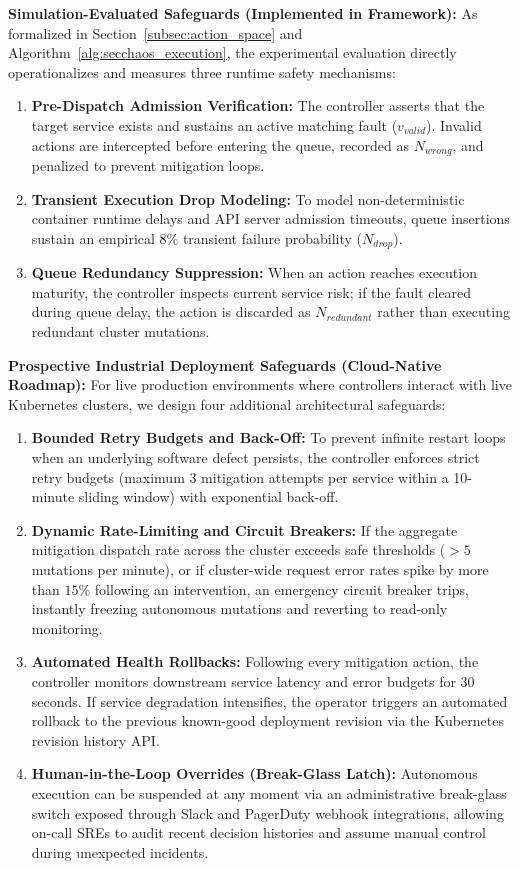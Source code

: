 \documentclass[ASNA,twocolumn]{USG}
\begin{document}
\textbf{Simulation-Evaluated Safeguards (Implemented in Framework):} As formalized in Section~\ref{subsec:action_space} and Algorithm~\ref{alg:secchaos_execution}, the experimental evaluation directly operationalizes and measures three runtime safety mechanisms:
\begin{enumerate}
    \item \textbf{Pre-Dispatch Admission Verification:} The controller asserts that the target service exists and sustains an active matching fault ($v_{valid}$). Invalid actions are intercepted before entering the queue, recorded as $N_{wrong}$, and penalized to prevent mitigation loops.
    \item \textbf{Transient Execution Drop Modeling:} To model non-deterministic container runtime delays and API server admission timeouts, queue insertions sustain an empirical $8\%$ transient failure probability ($N_{drop}$).
    \item \textbf{Queue Redundancy Suppression:} When an action reaches execution maturity, the controller inspects current service risk; if the fault cleared during queue delay, the action is discarded as $N_{redundant}$ rather than executing redundant cluster mutations.
\end{enumerate}

\textbf{Prospective Industrial Deployment Safeguards (Cloud-Native Roadmap):} For live production environments where controllers interact with live Kubernetes clusters, we design four additional architectural safeguards:
\begin{enumerate}
    \item \textbf{Bounded Retry Budgets and Back-Off:} To prevent infinite restart loops when an underlying software defect persists, the controller enforces strict retry budgets (maximum 3 mitigation attempts per service within a 10-minute sliding window) with exponential back-off.
    \item \textbf{Dynamic Rate-Limiting and Circuit Breakers:} If the aggregate mitigation dispatch rate across the cluster exceeds safe thresholds ($> 5$ mutations per minute), or if cluster-wide request error rates spike by more than $15\%$ following an intervention, an emergency circuit breaker trips, instantly freezing autonomous mutations and reverting to read-only monitoring.
    \item \textbf{Automated Health Rollbacks:} Following every mitigation action, the controller monitors downstream service latency and error budgets for 30 seconds. If service degradation intensifies, the operator triggers an automated rollback to the previous known-good deployment revision via the Kubernetes revision history API.
    \item \textbf{Human-in-the-Loop Overrides (Break-Glass Latch):} Autonomous execution can be suspended at any moment via an administrative break-glass switch exposed through Slack and PagerDuty webhook integrations, allowing on-call SREs to audit recent decision histories and assume manual control during unexpected incidents.
\end{enumerate}
\end{document}
